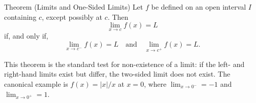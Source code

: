 \begin{theorembox}{Theorem (Limits and One-Sided Limits)}
Let $f$ be defined on an open interval $I$ containing $c$,
except possibly at $c$. Then
\[
  \lim_{x \to c} f(x) = L
\]
if, and only if,
\[
  \lim_{x \to c^-} f(x) = L \quad \text{and} \quad
  \lim_{x \to c^+} f(x) = L.
\]
\end{theorembox}

\begin{remark*}
This theorem is the standard test for non-existence of a limit:
if the left- and right-hand limits exist but differ, the
two-sided limit does not exist.
The canonical example is $f(x) = |x|/x$ at $x = 0$, where
$\lim_{x \to 0^-} = -1$ and $\lim_{x \to 0^+} = 1$.
\end{remark*}
